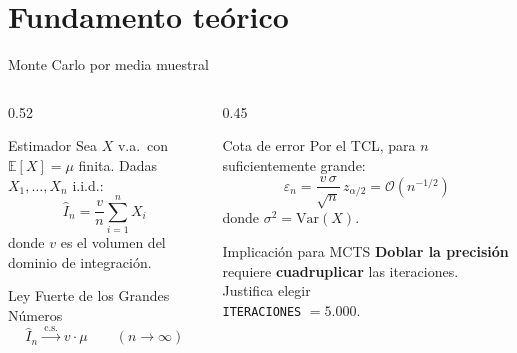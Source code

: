 \documentclass[aspectratio=169, 10pt]{beamer}
\begin{document}
\section{Fundamento teórico}

\begin{frame}{Monte Carlo por media muestral}
  \begin{columns}[T]
    \begin{column}{0.52\textwidth}
      \begin{block}{Estimador}
        Sea $X$ v.a.\ con $\mathbb{E}[X] = \mu$ finita. Dadas $X_1,\ldots,X_n$
        i.i.d.:
        \[
          \widehat{I}_n = \frac{v}{n}\sum_{i=1}^n X_i
        \]
        donde $v$ es el volumen del dominio de integración.
      \end{block}
      \vspace{0.3cm}
      \begin{block}{Ley Fuerte de los Grandes Números}
        \[
          \widehat{I}_n \xrightarrow{\ \text{c.s.}\ } v\cdot\mu
          \qquad (n\to\infty)
        \]
      \end{block}
    \end{column}
    \begin{column}{0.45\textwidth}
      \begin{exampleblock}{Cota de error}
        Por el TCL, para $n$ suficientemente grande:
        \[
          \varepsilon_n
          = \frac{v\,\sigma}{\sqrt{n}}\,z_{\alpha/2}
          = \mathcal{O}(n^{-1/2})
        \]
        donde $\sigma^2 = \mathrm{Var}(X)$.
      \end{exampleblock}
      \vspace{0.3cm}
      \begin{alertblock}{Implicación para MCTS}
        \textbf{Doblar la precisión} requiere \textbf{cuadruplicar}
        las iteraciones. Justifica elegir\\
        \centering
        \texttt{ITERACIONES} $= 5.000$.
      \end{alertblock}
    \end{column}
  \end{columns}
\end{frame}
\end{document}
